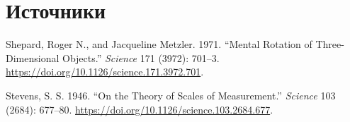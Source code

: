 \documentclass[
  letterpaper,
  DIV=11,
  numbers=noendperiod]{scrreprt}
\newlength{\cslhangindent}
\newenvironment{CSLReferences}[2] %
 {\begin{list}{}{%
  \setlength{\itemindent}{0pt}
  \setlength{\leftmargin}{0pt}
  \setlength{\parsep}{0pt}
  \ifodd #1
   \setlength{\leftmargin}{\cslhangindent}
   \setlength{\itemindent}{-1\cslhangindent}
  \fi
  \setlength{\itemsep}{#2\baselineskip}}}
 {\end{list}}
\theoremstyle{definition}
\theoremstyle{remark}
\begin{document}

\chapter*{Источники}\label{ux438ux441ux442ux43eux447ux43dux438ux43aux438}


\label{refs}
\begin{CSLReferences}{1}{0}
Shepard, Roger N., and Jacqueline Metzler. 1971. {``Mental Rotation of
Three-Dimensional Objects.''} \emph{Science} 171 (3972): 701--3.
\url{https://doi.org/10.1126/science.171.3972.701}.

Stevens, S. S. 1946. {``On the Theory of Scales of Measurement.''}
\emph{Science} 103 (2684): 677--80.
\url{https://doi.org/10.1126/science.103.2684.677}.

\end{CSLReferences}
\end{document}
